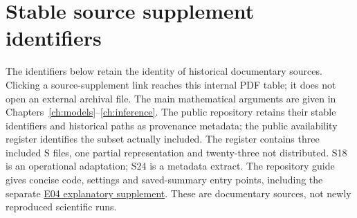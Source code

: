 \section{Stable source supplement identifiers}\label{sec:source-supplements}
The identifiers below retain the identity of historical documentary sources. Clicking a source-supplement link reaches this internal PDF table; it does not open an external archival file. The main mathematical arguments are given in Chapters~\ref{ch:models}--\ref{ch:inference}. The public repository retains their stable identifiers and historical paths as provenance metadata; the public availability register identifies the subset actually included. The register contains three included S files, one partial representation and twenty-three not distributed. S18 is an operational adaptation; S24 is a metadata extract. The repository guide  gives concise code, settings and saved-summary entry points, including the separate \href{https://github.com/Drefetr/InhibitoryEarthquakeModels/blob/main/paper/supplements/explanatory_supplement.pdf}{E04 explanatory supplement}. These are documentary sources, not newly reproduced scientific runs.

